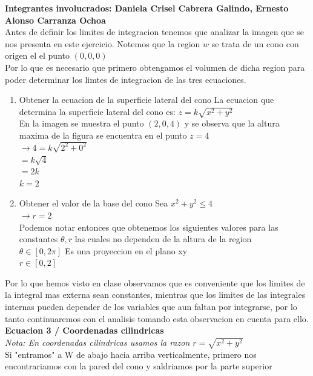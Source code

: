 \begin{respuesta}
    \textbf{Integrantes involucrados: Daniela Crisel Cabrera Galindo, Ernesto Alonso Carranza Ochoa}\\
    Antes de definir los limites de integracion tenemos que analizar la imagen que se nos presenta en este ejercicio. Notemos que la region $w$ se trata de un cono con origen el el punto $(0,0,0)$\\
    Por lo que es necesario que primero obtengamos el volumen de dicha region para poder determinar los limtes de integracion de las tres ecuaciones.\\
    \begin{enumerate}
        \item Obtener la ecuacion de la superficie lateral del cono
        La ecuacion que determina la superficie lateral del cono es: $z = k \sqrt{x^2 + y^2}$\\
        En la imagen se muestra el punto $(2,0,4)$ y se observa que la altura maxima de la figura se encuentra en el punto $z = 4$\\
        $ \longrightarrow 4 = k \sqrt{2^2 + 0^2}$\\
        $= k \sqrt{4}$\\
        $ = 2k$\\
        $ k = 2$
        \item Obtener el valor de la base del cono
        Sea $x^2 + y^2 \leq 4$\\ $\longrightarrow r = 2$\\
        Podemos notar entonces que obtenemos los siguientes valores para las constantes $\theta, r$ las cuales no dependen de la altura de la region\\
        $\theta \in [0,2 \pi]$ Es una proyeccion en el plano xy\\
        $r \in [0,2] $     
    \end{enumerate}
    Por lo que hemos visto en clase observamos que es conveniente que los limites de la integral mas externa sean constantes, mientras que los limites de las integrales internas pueden depender de los variables que aun faltan por integrarse, por lo tanto continuaremos con el analisis tomando esta observacion en cuenta para ello.\\
    \textbf{Ecuacion 3 / Coordenadas cilindricas}\\
    \textit{Nota: En coordenadas cilindricas usamos la razon $r = \sqrt{x^2 + y ^2}$}\\
    Si "entramos" a W de abajo hacia arriba verticalmente, primero nos encontrariamos con la pared del cono y saldriamos por la parte superior\\
    

\end{respuesta}
